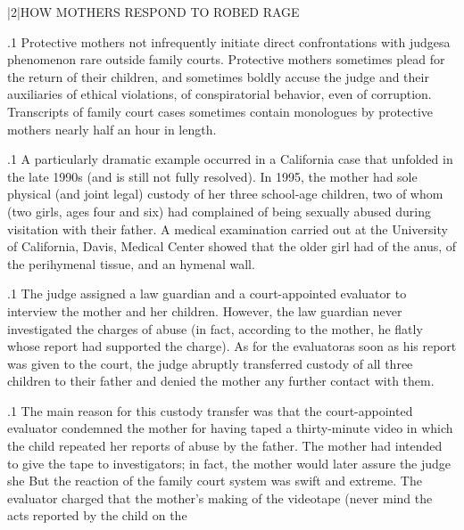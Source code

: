 \documentclass[11pt, twoside]{article}
\begin{document}
{\s|2|{HOW MOTHERS RESPOND TO ROBED RAGE}

\p.1{%
\noindent{}Protective mothers not infrequently initiate direct confrontations with
judges\mdash{}a phenomenon rare outside family courts. Protective mothers sometimes plead for the return of their children, and sometimes
boldly accuse the judge and their auxiliaries of ethical violations, of
conspiratorial behavior, even of corruption. Transcripts of family court
cases sometimes contain monologues by protective mothers nearly half
an hour in length.
}%

\p.1{%
A particularly dramatic example occurred in a California case that
unfolded in the late 1990s (and is still not fully resolved). In
1995, the mother had sole physical (and
joint legal) custody of her three school-age children, two of whom (two
girls, ages four and six) had complained of being sexually abused during
visitation with their father. A medical examination carried out at the
University of California, Davis, Medical Center showed that the older
girl had  of the anus,  of the perihymenal tissue, and an 
hymenal wall.
}%

\p.1{%
The judge assigned a law guardian and a court-appointed evaluator
to interview the mother and her children. However, the law guardian
never investigated the charges of abuse (in fact, according to the mother,
he flatly  whose report had
supported the charge). As for the evaluator\mdash{}as soon as his report was
given to the court, the judge abruptly transferred custody of all three
children to their father and denied the mother any further contact with
them.
}%

\p.1{%
The main reason for this custody transfer was that the
court-appointed evaluator condemned the mother for having taped a
thirty-minute video in which the child repeated her reports of abuse by the
father. The mother had intended to give the tape to investigators; in fact,
the mother would later assure the judge she  But the reaction of the family court system
was swift and extreme. The evaluator charged that the mother’s making of the videotape (never mind the acts reported by the child on the
}%

}
\end{document}
